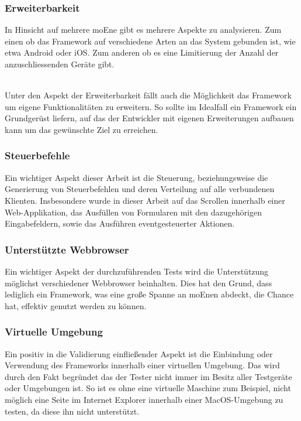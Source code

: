 	\pagebreak
	 \subsubsection{Erweiterbarkeit}
	 In Hinsicht auf mehrere \Gls{moEn}e gibt es mehrere Aspekte zu analysieren. Zum einen ob das \Gls{Framework} auf verschiedene 	Arten an das System gebunden ist, wie etwa Android oder iOS. Zum anderen ob es eine Limitierung der Anzahl der 				anzuschliessenden Geräte gibt. 

	\\Unter den Aspekt der Erweiterbarkeit fällt auch die Möglichkeit das \Gls{Framework} um eigene Funktionalitäten zu erweitern. So 		sollte im Idealfall ein \Gls{Framework} ein Grundgerüst liefern, auf das der Entwickler mit eigenen Erweiterungen aufbauen kann um 	das gewünschte Ziel zu erreichen.
	
	\subsubsection{Steuerbefehle}
	Ein wichtiger Aspekt dieser Arbeit ist die Steuerung, beziehungsweise die Generierung von Steuerbefehlen und deren Verteilung auf alle verbundenen Klienten. Insbesondere wurde in dieser Arbeit auf das Scrollen innerhalb einer \mbox{Web-Applikation}, das Ausfüllen von Formularen mit den dazugehörigen Eingabefeldern, sowie das Ausführen eventgesteuerter Aktionen.

	\subsubsection{Unterstützte \Gls{Webbrowser}}
	Ein wichtiger Aspekt der durchzuführenden Tests wird die Unterstützung möglichst verschiedener \Gls{Webbrowser} beinhalten. Dies hat 	den Grund, dass lediglich ein \Gls{Framework}, was eine große Spanne an \Gls{moEn}en abdeckt, die Chance hat, effektiv genutzt werden 	zu können.

	\subsubsection{Virtuelle Umgebung}
	Ein positiv in die Validierung einfließender Aspekt ist die Einbindung oder Verwendung des \Gls{Framework}s innerhalb einer 			virtuellen Umgebung. Das wird durch den Fakt begründet das der Tester nicht immer im Besitz aller Testgeräte oder 				Umgebungen ist. So ist es ohne eine virtuelle Maschine zum Beispiel, nicht möglich eine Seite im Internet Explorer innerhalb 		einer MacOS-Umgebung zu testen, da diese ihn nicht unterstützt.

